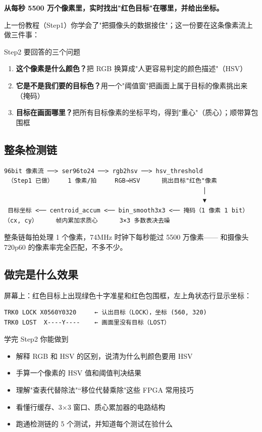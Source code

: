 \documentclass[11pt]{ctexart}
\begin{document}
\textbf{从每秒 5500 万个像素里，实时找出"红色目标"在哪里，并给出坐标。}

上一份教程（Step1）你学会了"把摄像头的数据接住"；这一份要在这条像素流上做三件事：

\begin{keybox}{Step2 要回答的三个问题}
\begin{enumerate}
  \item \textbf{这个像素是什么颜色？}\quad 把 RGB 换算成"人更容易判定的颜色描述"（HSV）
  \item \textbf{它是不是我们要的目标色？}\quad 用一个"阈值窗"把画面上属于目标的像素挑出来（掩码）
  \item \textbf{目标在画面哪里？}\quad 把所有目标像素的坐标平均，得到"重心"（质心）；顺带算包围框
\end{enumerate}
\end{keybox}

\subsection{整条检测链}

\begin{Verbatim}[frame=single,fontsize=\small]
 96bit 像素流 ──> ser96to24 ──> rgb2hsv ──> hsv_threshold
 （Step1 已做）    1 像素/拍     RGB→HSV      挑出目标"红色"像素
                                                       │
                                                       ▼
 目标坐标 <── centroid_accum <── bin_smooth3x3 <── 掩码（1 像素 1 bit）
（cx, cy）     帧内累加求质心      3×3 多数表决去噪
\end{Verbatim}

整条链每拍处理 1 个像素，74MHz 时钟下每秒能过 5500 万像素——
和摄像头 720p60 的像素率完全匹配，不多不少。

\subsection{做完是什么效果}

屏幕上：红色目标上出现绿色十字准星和红色包围框，左上角状态行显示坐标：
\begin{Verbatim}[frame=single,fontsize=\small]
TRK0 LOCK X0560Y0320     ← 认出目标（LOCK），坐标 (560, 320)
TRK0 LOST  X----Y----    ← 画面里没有目标（LOST）
\end{Verbatim}

\begin{okbox}{学完 Step2 你能做到}
\begin{itemize}
  \item 解释 RGB 和 HSV 的区别，说清为什么判颜色要用 HSV
  \item 手算一个像素的 HSV 值和阈值判决结果
  \item 理解"查表代替除法"“移位代替乘除"这些 FPGA 常用技巧
  \item 看懂行缓存、3×3 窗口、质心累加器的电路结构
  \item 跑通检测链的 5 个测试，并知道每个测试在验什么
\end{itemize}
\end{okbox}
\end{document}
